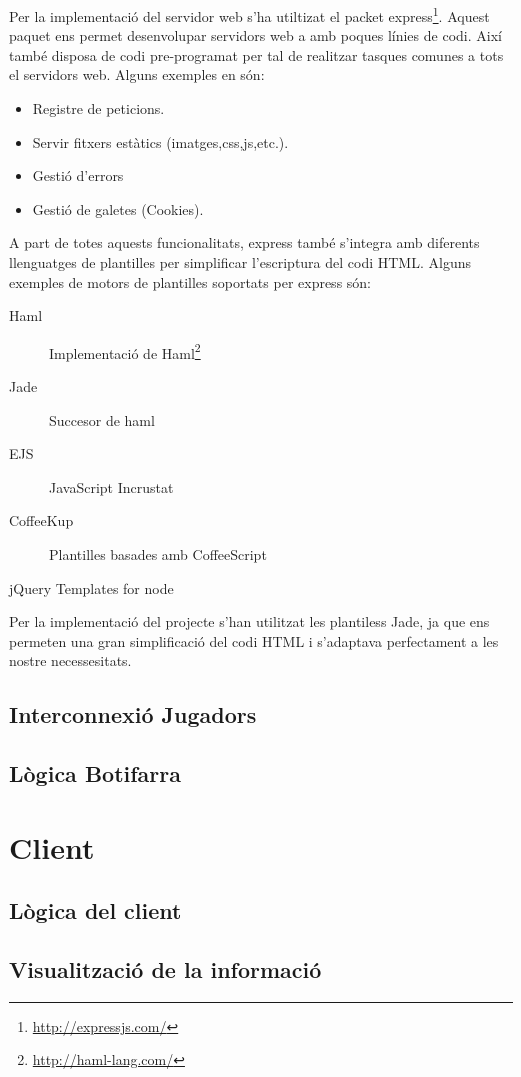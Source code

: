 Per la implementació del servidor web s'ha utiltizat el packet express\footnote{\url{http://expressjs.com/}}. Aquest paquet ens permet desenvolupar servidors web a amb poques línies de codi. Així també disposa de codi pre-programat per tal de realitzar tasques comunes a tots el servidors web. Alguns exemples en són:

\begin{itemize}
\item{Registre de peticions.}
\item{Servir fitxers estàtics (imatges,css,js,etc.).}
\item{Gestió d'errors}
\item{Gestió de galetes (Cookies).}
\end{itemize}

A part de totes aquests funcionalitats, express també s'integra amb diferents llenguatges de plantilles per simplificar l'escriptura del codi HTML. Alguns exemples de motors de plantilles soportats per express són: 

\begin{description}
\item[Haml] {Implementació de Haml\footnote{\url{http://haml-lang.com/}} }
\item[Jade] {Succesor de haml}
\item[EJS] {JavaScript Incrustat}
\item[CoffeeKup] {Plantilles basades amb CoffeeScript}
\item[jQuery Templates for node]
\end{description}

Per la implementació del projecte s'han utilitzat les plantiless Jade, ja que ens permeten una gran simplificació del codi HTML i s'adaptava perfectament a les nostre necessesitats.

\subsection{Interconnexió Jugadors}

\subsection{Lògica Botifarra}

\section{Client}

\subsection{Lògica del client}

\subsection{Visualització de la informació}
